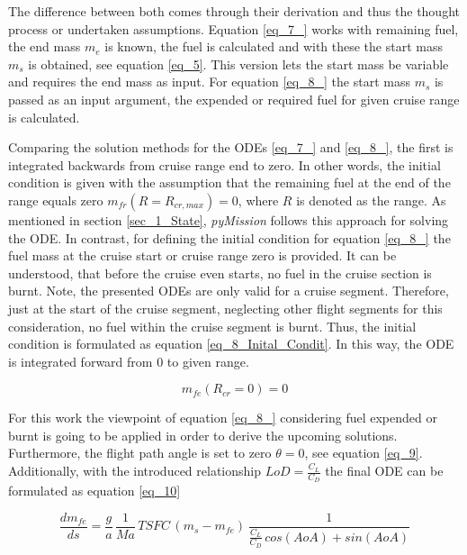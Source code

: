 The difference between both comes through their derivation and 
thus the thought process or undertaken assumptions. 
Equation \eqref{eq_7_} works with remaining fuel, 
the end mass $m_{e}$ is known, 
the fuel is calculated and with these 
the start mass $m_{s}$ is obtained, see 
equation \eqref{eq_5}. This version lets 
the start mass be variable and requires 
the end mass as input. For equation 
\eqref{eq_8_} the start mass $m_{s}$ is 
passed as an input argument, the expended or required 
fuel for given cruise range is calculated. \newline 

Comparing 
the solution methods for the ODEs \eqref{eq_7_} 
and \eqref{eq_8_}, the first is integrated backwards
from cruise range end to zero.
In other words, the initial condition is given 
with the assumption that the remaining fuel 
at the end of the range equals zero $m_{fr}(R=R_{cr,max}) =0$, 
where $R$ is denoted as the range. As mentioned in 
section \ref{sec_1_State}, \emph{pyMission} follows 
this approach for solving the ODE.
In contrast, for defining the initial condition 
for equation \eqref{eq_8_} the fuel 
mass at the cruise start or cruise range zero 
is provided. 
It can be understood, that before the 
cruise even starts, no fuel in the cruise 
section is burnt. Note, the presented ODEs 
are only valid for a cruise segment. Therefore, 
just at the start of the cruise segment, neglecting 
other flight segments for this consideration, no 
fuel within the cruise segment is burnt.
Thus, the initial condition is formulated as 
equation \eqref{eq_8_Inital_Condit}. In this way, the ODE is 
integrated forward from 0 to given range.\newline

\begin{equation}
    \label{eq_8_Inital_Condit}
    m_{fe}(R_{cr}=0) = 0
\end{equation}

For this work the viewpoint of equation \ref{eq_8_} 
considering  
fuel expended or burnt is going 
to be applied in order to derive the upcoming 
solutions. Furthermore, the flight path angle is 
set to zero 
$\theta = 0$, see equation \eqref{eq_9}. Additionally, with the introduced 
relationship $LoD = \frac{C_L}{C_D}$ the final 
ODE can be formulated as equation \eqref{eq_10} \newline

\begin{equation}
    \label{eq_9}  
    \frac{dm_{fe}}{ds} = \frac{g}{a} \, \frac{1}{Ma}\,TSFC \,(m_s - m_{fe})
    \, \frac{1}{
        \frac{C_L}{C_D} \, cos(AoA) + sin(AoA)}  
\end{equation}


